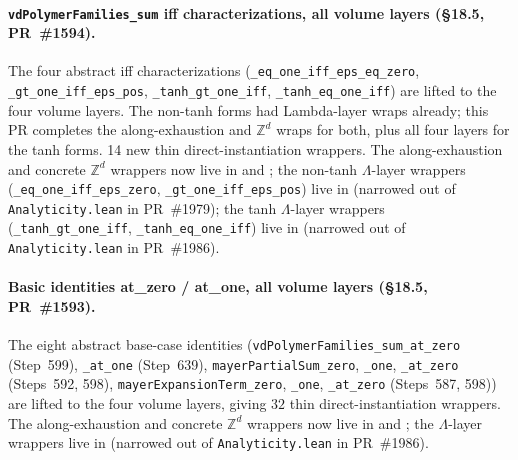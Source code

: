 \documentclass[a4paper,11pt]{article}
\begin{document}
\paragraph{\texttt{vdPolymerFamilies\_sum} iff characterizations,
all volume layers (\S18.5, PR~\#1594).} The four abstract iff
characterizations (\texttt{\_eq\_one\_iff\_eps\_eq\_zero},
\texttt{\_gt\_one\_iff\_eps\_pos},
\texttt{\_tanh\_gt\_one\_iff}, \texttt{\_tanh\_eq\_one\_iff}) are
lifted to the four volume layers. The non-tanh forms had Lambda-layer
wraps already; this PR completes the along-exhaustion and
$\mathbb{Z}^d$ wraps for both, plus all four layers for the tanh
forms. 14 new thin direct-instantiation wrappers.
The along-exhaustion and concrete $\mathbb{Z}^d$ wrappers now live in
and
;
the non-tanh $\Lambda$-layer wrappers
(\texttt{\_eq\_one\_iff\_eps\_zero}, \texttt{\_gt\_one\_iff\_eps\_pos})
live in
(narrowed out of \texttt{Analyticity.lean} in PR~\#1979);
the tanh $\Lambda$-layer wrappers
(\texttt{\_tanh\_gt\_one\_iff}, \texttt{\_tanh\_eq\_one\_iff}) live in
(narrowed out of \texttt{Analyticity.lean} in PR~\#1986).

\paragraph{Basic identities at\_zero / at\_one, all volume layers
(\S18.5, PR~\#1593).} The eight abstract base-case identities
(\texttt{vdPolymerFamilies\_sum\_at\_zero} (Step~599),
\texttt{\_at\_one} (Step~639),
\texttt{mayerPartialSum\_zero}, \texttt{\_one},
\texttt{\_at\_zero} (Steps~592, 598),
\texttt{mayerExpansionTerm\_zero}, \texttt{\_one},
\texttt{\_at\_zero} (Steps~587, 598)) are lifted to the four
volume layers, giving $32$ thin direct-instantiation wrappers. The
along-exhaustion and concrete $\mathbb{Z}^d$ wrappers now live in
and
;
the $\Lambda$-layer wrappers live in
(narrowed out of \texttt{Analyticity.lean} in PR~\#1986).
\end{document}
